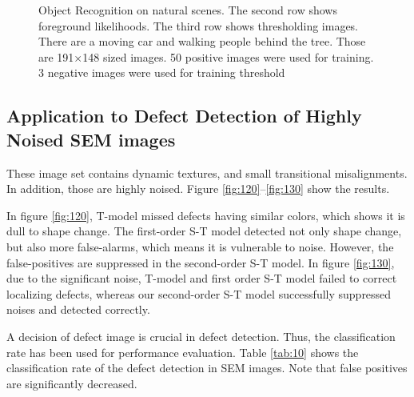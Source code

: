 \documentclass[conference]{IEEEtran}
\begin{document}
\begin{figure}[!t]
  \hfill
  \hfill
  \caption{Object Recognition on natural scenes. The second row shows foreground likelihoods. The third row shows thresholding images. There are a moving car and walking people behind the tree. Those are 191×148 sized images. 50 positive images were used for training. 3 negative images were used for training threshold}
\end{figure}

\subsection{Application to Defect Detection of Highly Noised SEM images}
These image set contains dynamic textures, and small transitional misalignments. In addition, those are highly noised. Figure \ref{fig:120}–\ref{fig:130} show the results. 

In figure \ref{fig:120}, T-model missed defects having similar colors, which shows it is dull to shape change. The first-order S-T model detected not only shape change, but also more false-alarms, which means it is vulnerable to noise. However, the false-positives are suppressed in the second-order S-T model. In figure \ref{fig:130}, due to the significant noise, T-model and first order S-T model failed to correct localizing defects, whereas our second-order S-T model successfully suppressed noises and detected correctly.

A decision of defect image is crucial in defect detection. Thus, the classification rate has been used for performance evaluation. Table \ref{tab:10} shows the classification rate of the defect detection in SEM images. Note that false positives are significantly decreased.
\end{document}
